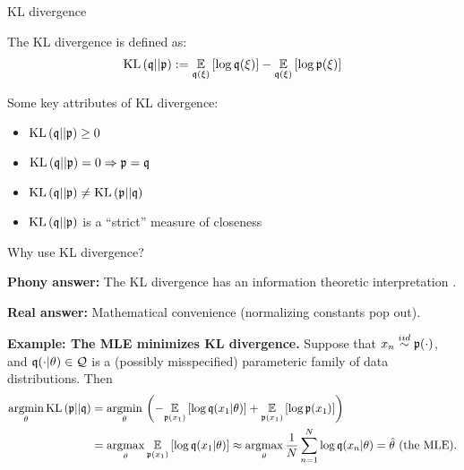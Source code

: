 \begin{frame}{KL divergence}

The KL divergence is defined as:
%
\begin{align*}
%
\kl{\q}{\p} :=
\expect{\q(\xi)}{\log \q(\xi)} - \expect{\q(\xi)}{\log \p(\xi)}
%
\end{align*}
%

Some key attributes of KL divergence:
\begin{itemize}
    \item $\mathrm{KL}\left(\mathfrak{q} || \mathfrak{p} \right) \ge 0$
    \item $\mathrm{KL}\left(\mathfrak{q} || \mathfrak{p} \right) = 0 \Rightarrow \mathfrak{p} = \mathfrak{q}$
    \item $\mathrm{KL}\left(\mathfrak{q} || \mathfrak{p} \right) \ne \mathrm{KL}\left(\mathfrak{p} || \mathfrak{q} \right)$
    \item $\mathrm{KL}\left(\mathfrak{q} || \mathfrak{p} \right)$ is a ``strict'' measure of closeness
        \citep{gibbs2002choosing}
\end{itemize}

\pause

Why use KL divergence?

\textbf{Phony answer:}
The KL divergence has an information theoretic
interpretation \citep{kullback1951information}.

\textbf{Real answer:}
Mathematical convenience (normalizing constants pop out).

\pause

\textbf{Example: The MLE minimizes KL divergence.}  Suppose that $x_n \overset{iid}{\sim}
\mathfrak{p}(\cdot)$, and $\mathfrak{q}(\cdot | \theta) \in \mathcal{Q}$ is a (possibly misspecified)
parameteric family of data distributions. Then
%
\begin{align*}
%
\argmin{\theta} \kl{\p}{\q} ={}&
\argmin{\theta}\left(  - \expect{\p(x_1)}{\log \q(x_1 | \theta)}
    + \expect{\p(x_1)}{\log \p(x_1)} \right) \\
={}&
\argmax{\theta} \expect{\p(x_1)}{\log \q(x_1 | \theta)}
\approx \argmax{\theta} \meann \log \q(x_n | \theta) =
\thetahat\textrm{ (the MLE)}.
%
\end{align*}

\end{frame}
